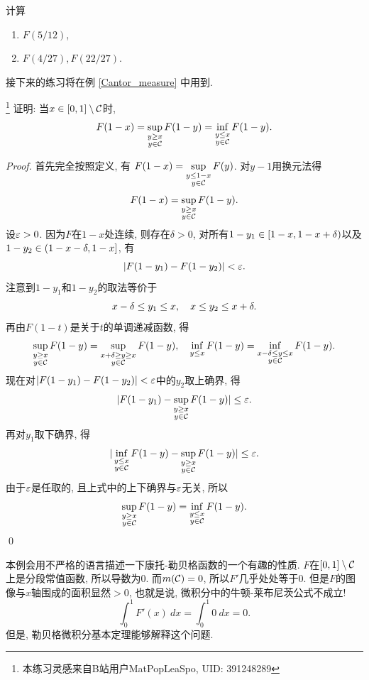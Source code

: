 \begin{exercise}
    计算
    \begin{enumerate}
    \item $F(5/12)$, 
    \item $F(4/27), F(22/27)$.
    \end{enumerate}
\end{exercise}
接下来的练习将在例 \ref{Cantor_measure} 中用到. 
\begin{exercise}\footnote{本练习灵感来自B站用户MatPopLeaSpo, UID: 391248289}
    证明: 当$x \in [0,1] \setminus \mathcal{C}$时, 
    $$ F(1-x) = \sup_{\substack{y \geq x \\ y \in \mathcal{C}}} F(1-y) = 
    \inf_{\substack{y \leq x \\ y \in \mathcal{C}}} F(1-y). $$
\end{exercise}
\begin{proof}
    首先完全按照定义, 有
    $\displaystyle{F(1-x) = \sup_{\substack{y \leq 1-x \\ y \in \mathcal{C}}} F(y)} $. 对$y-1$用换元法得
    $$F(1-x) = \sup_{\substack{y \geq x \\ y \in \mathcal{C}}} F(1-y). $$
    设$\varepsilon > 0$. 因为$F$在$1-x$处连续, 则存在$\delta>0$, 对所有$1-y_1 \in [1-x, 1-x+\delta)$以及$1-y_2 \in (1-x-\delta, 1-x]$, 有
    $$ |F(1-y_1) - F(1-y_2)| < \varepsilon. $$
    注意到$1-y_1$和$1-y_2$的取法等价于
    $$ x-\delta \leq y_1 \leq x, \quad x \leq y_2 \leq x+\delta. $$
    再由$F(1-t)$是关于$t$的单调递减函数, 得
    $$ \sup_{\substack{y \geq x \\ y \in \mathcal{C}}} F(1-y) = 
    \sup_{\substack{x+\delta \geq y \geq x \\ y \in \mathcal{C}}} F(1-y), \quad
    \inf_{\substack{y \leq x }} F(1-y) = 
    \inf_{\substack{x-\delta \leq y \leq x \\ y \in \mathcal{C}}} F(1-y). $$
    现在对$|F(1-y_1)-F(1-y_2)| < \varepsilon$中的$y_2$取上确界, 得
    $$ |F(1-y_1) -  \sup_{\substack{y \geq x \\ y \in \mathcal{C}}} F(1-y)| \leq \varepsilon. $$ 再对$y_1$取下确界, 得
    $$|\inf_{\substack{y \leq x \\ y \in \mathcal{C}}} F(1-y) -  \sup_{\substack{y \geq x \\ y \in \mathcal{C}}} F(1-y)| \leq \varepsilon. $$
    由于$\varepsilon$是任取的, 且上式中的上下确界与$\varepsilon$无关, 所以
    $$ \sup_{\substack{y \geq x \\ y \in \mathcal{C}}} F(1-y) = 
    \inf_{\substack{y \leq x \\ y \in \mathcal{C}}} F(1-y). $$ \qed     
\end{proof}
\begin{example}[~(预告)]
    本例会用不严格的语言描述一下康托-勒贝格函数的一个有趣的性质.
    $F$在$[0,1]\setminus \mathcal{C}$上是分段常值函数, 所以导数为$0$. 而$m(\mathcal{C}) = 0$, 所以$F'$几乎处处等于$0$. 但是$F$的图像与$x$轴围成的面积显然$>0$, 也就是说, 微积分中的牛顿-莱布尼茨公式不成立!
    $$\int_0^1 F'(x)~dx = \int_0^1 0~dx = 0. $$
    但是, 勒贝格微积分基本定理能够解释这个问题. 
\end{example}


